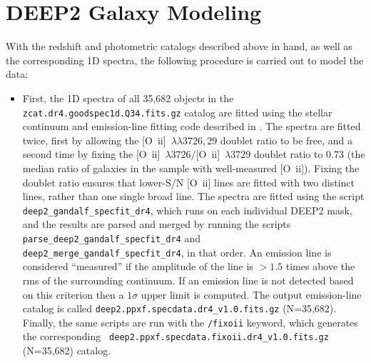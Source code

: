 \documentclass[12pt]{article}
\newcommand{\oii}{[O~{\sc ii}]}
\newcommand{\oiilam}{[O~{\sc ii}]~\ensuremath{\lambda\lambda3726,29}}
\begin{document}

\section{DEEP2 Galaxy Modeling}


With the redshift and photometric catalogs described above in hand, as
well as the corresponding 1D spectra, the following procedure is
carried out to model the data:

\begin{itemize}
\item{First, the 1D spectra of all 35,682 objects in the {\tt
    zcat.dr4.goodspec1d.Q34.fits.gz} catalog are fitted using the
  stellar continuum and emission-line fitting code described in
  \citet{moustakas10a}.  The spectra are fitted twice, first by
  allowing the \oiilam{} doublet ratio to be free, and a second time
  by fixing the \oii~$\lambda3726/$\oii{}~$\lambda3729$ doublet ratio
  to $0.73$ (the median ratio of galaxies in the sample with
  well-measured \oii).  Fixing the doublet ratio ensures that
  lower-S/N \oii{} lines are fitted with two distinct lines, rather
  than one single broad line.  The spectra are fitted using the script
  {\tt deep2\_gandalf\_specfit\_dr4}, which runs on each individual
  DEEP2 mask, and the results are parsed and merged by running the
  scripts {\tt parse\_deep2\_gandalf\_specfit\_dr4} and {\tt
    deep2\_merge\_gandalf\_specfit\_dr4}, in that order.  An emission
  line is considered ``measured'' if the amplitude of the line is
  $>1.5$ times above the {\sc rms} of the surrounding continuum.  If
  an emission line is not detected based on this criterion then a
  $1\sigma$ upper limit is computed.  The output emission-line catalog
  is called {\tt deep2.ppxf.specdata.dr4\_v1.0.fits.gz} (N=35,682).
  Finally, the same scripts are run with the {\tt /fixoii} keyword,
  which generates the corresponding {\tt
    deep2.ppxf.specdata.fixoii.dr4\_v1.0.fits.gz} (N=35,682) catalog.}
     

\end{itemize}
\end{document}
